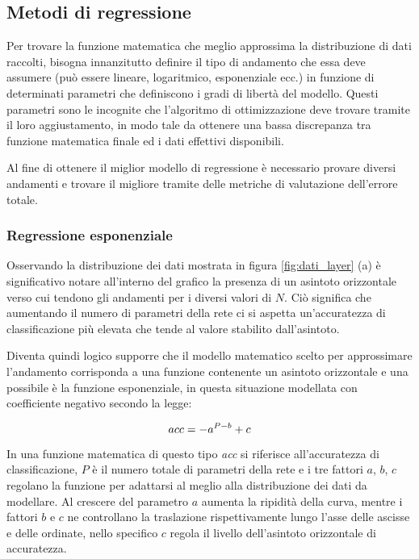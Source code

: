\subsection{Metodi di regressione}

Per trovare la funzione matematica che meglio approssima la distribuzione di dati raccolti, bisogna innanzitutto definire il tipo di andamento che essa deve assumere (può essere lineare, logaritmico, esponenziale ecc.) in funzione di determinati parametri che definiscono i gradi di libertà del modello. Questi parametri sono le incognite che l'algoritmo di ottimizzazione deve trovare tramite il loro aggiustamento, in modo tale da ottenere una bassa discrepanza tra funzione matematica finale ed i dati effettivi disponibili. 

Al fine di ottenere il miglior modello di regressione è necessario provare diversi andamenti e trovare il migliore tramite delle metriche di valutazione dell'errore totale.

\subsubsection{Regressione esponenziale}

Osservando la distribuzione dei dati mostrata in figura \ref{fig:dati_layer} (a) è significativo notare all'interno del grafico la presenza di un asintoto orizzontale verso cui tendono gli andamenti per i diversi valori di $N$. Ciò significa che aumentando il numero di parametri della rete ci si aspetta un'accuratezza di classificazione più elevata che tende al valore stabilito dall'asintoto.

Diventa quindi logico supporre che il modello matematico scelto per approssimare l'andamento corrisponda a una funzione contenente un asintoto orizzontale e una possibile è la funzione esponenziale, in questa situazione modellata con coefficiente negativo secondo la legge:

\begin{equation}
    \centering
    acc = -a^{P - b} + c
\end{equation}

In una funzione matematica di questo tipo \textit{acc} si riferisce all'accuratezza di classificazione, $P$ è il numero totale di parametri della rete e i tre fattori $a$, $b$, $c$ regolano la funzione per adattarsi al meglio alla distribuzione dei dati da modellare. Al crescere del parametro $a$ aumenta la ripidità della curva, mentre i fattori $b$ e $c$ ne controllano la traslazione rispettivamente lungo l'asse delle ascisse e delle ordinate, nello specifico $c$ regola il livello dell'asintoto orizzontale di accuratezza.

